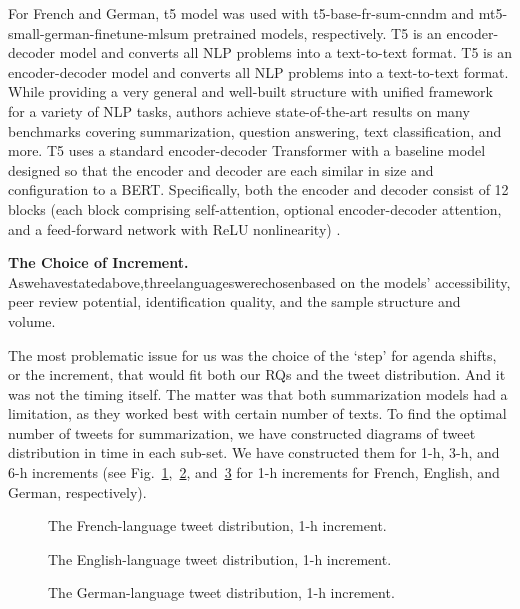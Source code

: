 For French and German, t5 model was used with t5-base-fr-sum-cnndm and mt5-small-german-finetune-mlsum pretrained models, respectively. T5 is an encoder-decoder model and converts all NLP problems into a text-to-text format. T5 is an encoder-decoder model and converts all NLP problems into a text-to-text format. While providing a very general and well-built structure with unified framework for a variety of NLP tasks, authors achieve state-of-the-art results on many benchmarks covering summarization, question answering, text classification, and more. T5 uses a standard encoder-decoder Transformer with a baseline model designed so that the encoder and decoder are each similar in size and configuration to a BERT. Specifically, both the encoder and decoder consist of 12 blocks (each block comprising self-attention, optional encoder-decoder attention, and a feed-forward network with ReLU nonlinearity) \cite{BeltagyPetersCohan}.

\textbf{The Choice of Increment.} Aswehavestatedabove,threelanguageswerechosenbased on the models’ accessibility, peer review potential, identification quality, and the sample structure and volume.

The most problematic issue for us was the choice of the ‘step’ for agenda shifts, or the increment, that would fit both our RQs and the tweet distribution. And it was not the timing itself. The matter was that both summarization models had a limitation, as they worked best with certain number of texts. To find the optimal number of tweets for summarization, we have constructed diagrams of tweet distribution in time in each sub-set. We have constructed them for 1-h, 3-h, and 6-h increments (see Fig.~\cref{fig:frenchTweetDistribution},~\cref{fig:englishTweetDistribution}, and~\cref{fig:germanTweetDistribution} for 1-h increments for French, English, and German, respectively).

\begin{figure}[ht]
	\caption{The French-language tweet distribution, 1-h increment.}\label{fig:frenchTweetDistribution}
\end{figure}

\begin{figure}[ht]
	\caption{The English-language tweet distribution, 1-h increment.}\label{fig:englishTweetDistribution}
\end{figure}

\begin{figure}[ht]
	\caption{The German-language tweet distribution, 1-h increment.}\label{fig:germanTweetDistribution}
\end{figure}

